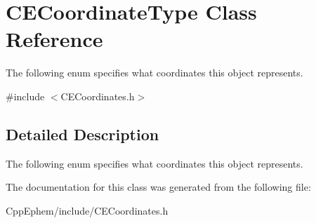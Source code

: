 \hypertarget{class_c_e_coordinate_type}{}\section{C\+E\+Coordinate\+Type Class Reference}
\label{class_c_e_coordinate_type}


The following enum specifies what coordinates this object represents.  




{\ttfamily \#include $<$C\+E\+Coordinates.\+h$>$}



\subsection{Detailed Description}
The following enum specifies what coordinates this object represents. 

The documentation for this class was generated from the following file\+:\begin{DoxyCompactItemize}
\item 
Cpp\+Ephem/include/C\+E\+Coordinates.\+h\end{DoxyCompactItemize}
